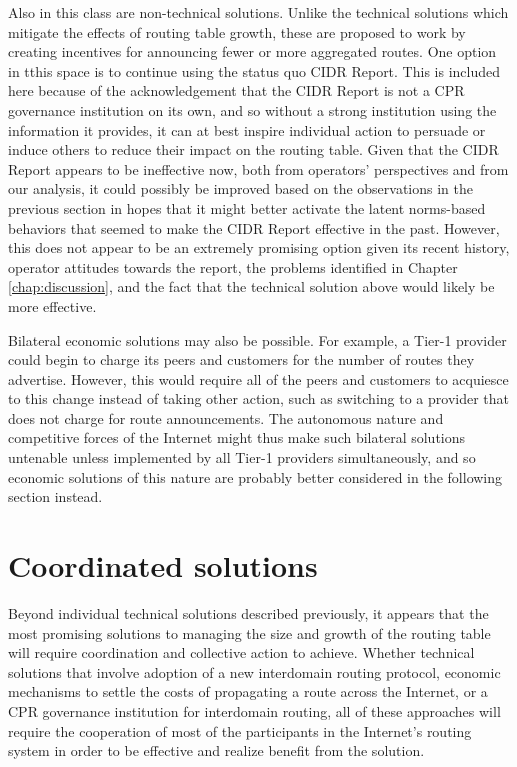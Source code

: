 Also in this class are non-technical solutions. Unlike the technical solutions
which mitigate the effects of routing table growth, these are proposed to work
by creating incentives for announcing fewer or more aggregated routes. One
option in tthis space is to continue using the status quo CIDR Report. This is
included here because of the acknowledgement that the CIDR Report is not a CPR
governance institution on its own, and so without a strong institution using
the information it provides, it can at best inspire individual action to
persuade or induce others to reduce their impact on the routing table. Given
that the CIDR Report appears to be ineffective now, both from operators'
perspectives and from our analysis, it could possibly be improved based on the
observations in the previous section in hopes that it might better activate the
latent norms-based behaviors that seemed to make the CIDR Report effective in
the past. However, this does not appear to be an extremely promising option
given its recent history, operator attitudes towards the report, the problems
identified in Chapter \ref{chap:discussion}, and the fact that the technical
solution above would likely be more effective.

Bilateral economic solutions may also be possible. For example, a Tier-1
provider could begin to charge its peers and customers for the number of routes
they advertise. However, this would require all of the peers and customers to
acquiesce to this change instead of taking other action, such as switching
to a provider that does not charge for route announcements. The autonomous
nature and competitive forces of the Internet might thus make such bilateral
solutions untenable unless implemented by all Tier-1 providers simultaneously,
and so economic solutions of this nature are probably better considered in the
following section instead.

\section{Coordinated solutions}
Beyond individual technical solutions described previously, it appears that the
most promising solutions to managing the size and growth of the routing table
will require coordination and collective action to achieve. Whether technical
solutions that involve adoption of a new interdomain routing protocol, economic
mechanisms to settle the costs of propagating a route across the Internet, or
a CPR governance institution for interdomain routing, all of these approaches
will require the cooperation of most of the participants in the Internet's
routing system in order to be effective and realize benefit from the solution.


